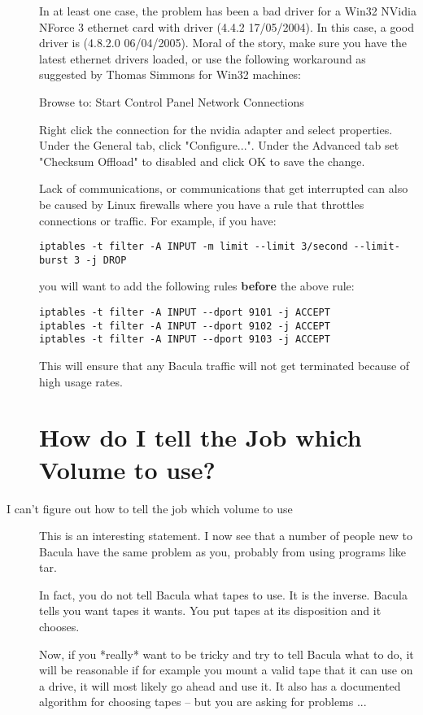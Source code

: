 \begin{description}
   In at least one case, the problem has been a bad driver for a Win32
   NVidia NForce 3 ethernet card with driver (4.4.2 17/05/2004). 
   In this case, a good driver is (4.8.2.0 06/04/2005).  Moral of
   the story, make sure you have the latest ethernet drivers
   loaded, or use the following workaround as suggested by Thomas
   Simmons for Win32 machines:
     
   Browse to:
   Start \gt{} Control Panel \gt{} Network Connections

   Right click the connection for the nvidia adapter and select properties. 
   Under the General tab, click "Configure...". Under the Advanced tab set 
   "Checksum Offload" to disabled and click OK to save the change.  

   Lack of communications, or communications that get interrupted can
   also be caused by Linux firewalls where you have a rule that throttles
   connections or traffic.  For example, if you have:

\footnotesize
\begin{verbatim}
iptables -t filter -A INPUT -m limit --limit 3/second --limit-burst 3 -j DROP
\end{verbatim}
\normalsize

   you will want to add the following rules {\bf before} the above rule:
\footnotesize
\begin{verbatim}
iptables -t filter -A INPUT --dport 9101 -j ACCEPT
iptables -t filter -A INPUT --dport 9102 -j ACCEPT
iptables -t filter -A INPUT --dport 9103 -j ACCEPT
\end{verbatim}
\normalsize
   This will ensure that any Bacula traffic will not get terminated because
   of high usage rates.
   
\section{How do I tell the Job which Volume to use?}
\item[I can't figure out how to tell the job which volume to use]
  This is an interesting statement. I now see that a number of people new to
  Bacula have the same problem as you, probably from using programs like tar.

  In fact, you do not tell Bacula what tapes to use.  It is the inverse.  Bacula
  tells you want tapes it wants.  You put tapes at its disposition and it
  chooses.  

  Now, if you *really* want to be tricky and try to tell Bacula what to do, it
  will be reasonable if for example you mount a valid tape that it can use on a
  drive, it will most likely go ahead and use it.  It also has a documented
  algorithm for choosing tapes -- but you are asking for problems ...


\end{description}

